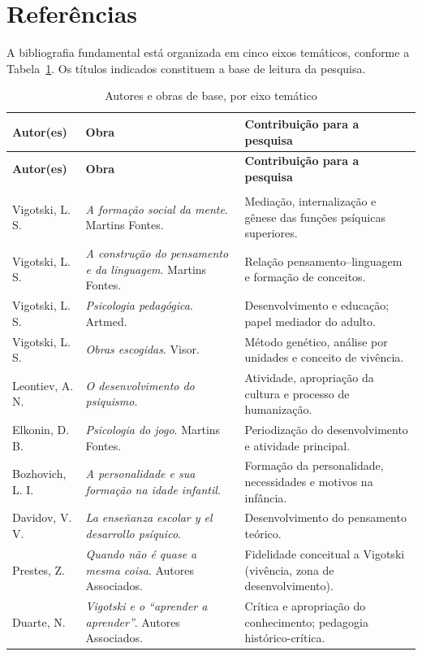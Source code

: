 \documentclass[
    a4paper,
    12pt,
    oneside,
    section=TITLE,
    brazilian,
    english
]{abntex2}
\begin{document}
\section*{Referências}\label{sec:referencias}

A bibliografia fundamental está organizada em cinco eixos temáticos, conforme a Tabela~\ref{tab:autores}. Os títulos indicados constituem a base de leitura da pesquisa.

\SingleSpacing
\small
\begin{longtable}{@{}p{3.6cm} p{4.0cm} p{7.5cm}@{}}
\caption{Autores e obras de base, por eixo temático}
\label{tab:autores}
\\
\toprule
\textbf{Autor(es)} & \textbf{Obra} & \textbf{Contribuição para a pesquisa} \\
\midrule
\endfirsthead
\toprule
\textbf{Autor(es)} & \textbf{Obra} & \textbf{Contribuição para a pesquisa} \\
\midrule
\endhead
\bottomrule
\endlastfoot

\multicolumn{3}{@{}l}{\textbf{Eixo 1 --- Psicologia histórico-cultural (fundamentos)}} \\
\midrule
Vigotski, L. S. & \emph{A formação social da mente}. Martins Fontes. & Mediação, internalização e gênese das funções psíquicas superiores. \\
Vigotski, L. S. & \emph{A construção do pensamento e da linguagem}. Martins Fontes. & Relação pensamento--linguagem e formação de conceitos. \\
Vigotski, L. S. & \emph{Psicologia pedagógica}. Artmed. & Desenvolvimento e educação; papel mediador do adulto. \\
Vigotski, L. S. & \emph{Obras escogidas}. Visor. & Método genético, análise por unidades e conceito de vivência. \\
Leontiev, A. N. & \emph{O desenvolvimento do psiquismo}. & Atividade, apropriação da cultura e processo de humanização. \\
Elkonin, D. B. & \emph{Psicologia do jogo}. Martins Fontes. & Periodização do desenvolvimento e atividade principal. \\
Bozhovich, L. I. & \emph{A personalidade e sua formação na idade infantil}. & Formação da personalidade, necessidades e motivos na infância. \\
Davidov, V. V. & \emph{La enseñanza escolar y el desarrollo psíquico}. & Desenvolvimento do pensamento teórico. \\
Prestes, Z. & \emph{Quando não é quase a mesma coisa}. Autores Associados. & Fidelidade conceitual a Vigotski (vivência, zona de desenvolvimento). \\
Duarte, N. & \emph{Vigotski e o ``aprender a aprender''}. Autores Associados. & Crítica e apropriação do conhecimento; pedagogia histórico-crítica. \\
\midrule


\end{longtable}
\end{document}
